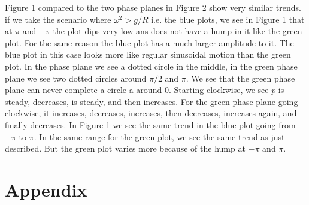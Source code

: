 \documentclass[12pt]{article}
\begin{document}
Figure 1 compared to the two phase planes in Figure 2 show very similar trends. if we take the scenario where $\omega^{2} > g/R$ i.e. the blue plots, we see in Figure 1 that at $\pi$ and $-\pi$ the plot dips very low ans does not have a hump in it like the green plot. For the same reason the blue plot has a much larger amplitude to it. The blue plot in this case looks more like regular sinusoidal motion than the green plot. In the phase plane we see a dotted circle in the middle, in the green phase plane we see two dotted circles around $\pi/2$ and $\pi$. We see that the green phase plane can never complete a circle a around $0$. Starting clockwise, we see $p$ is steady, decreases, is steady, and then increases. For the green phase plane going clockwise, it increases, decreases, increases, then decreases, increases again, and finally decreases. In Figure 1 we see the same trend in the blue plot going from $-\pi$ to $\pi$. In the same range for the green plot, we see the same trend as just described. But the green plot varies more because of the hump at $-\pi$ and $\pi$.

\newpage
\section*{Appendix}
\end{document}
